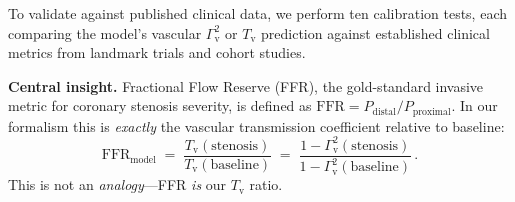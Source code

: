 ﻿\documentclass[aps,pre,twocolumn,superscriptaddress,floatfix]{revtex4-2}
\newcommand{\Gv}{\Gamma_{\mathrm{v}}}
\newcommand{\Tv}{T_{\mathrm{v}}}
\begin{document}
To validate against published clinical data, we perform
ten calibration tests, each comparing the model's
vascular $\Gv^2$ or $\Tv$ prediction against established
clinical metrics from landmark trials and cohort studies.

\textbf{Central insight.}  Fractional Flow Reserve (FFR),
the gold-standard invasive metric for coronary stenosis
severity, is defined as
$\mathrm{FFR} = P_{\text{distal}} / P_{\text{proximal}}$.
In our formalism this is \emph{exactly} the vascular
transmission coefficient relative to baseline:
\begin{equation}
  \mathrm{FFR}_{\text{model}} \;=\;
    \frac{\Tv(\text{stenosis})}{\Tv(\text{baseline})}
  \;=\;
    \frac{1 - \Gv^2(\text{stenosis})}{1 - \Gv^2(\text{baseline})}\,.
  \label{eq:ffr}
\end{equation}
This is not an \emph{analogy}---FFR \emph{is} our $\Tv$ ratio.
\end{document}

